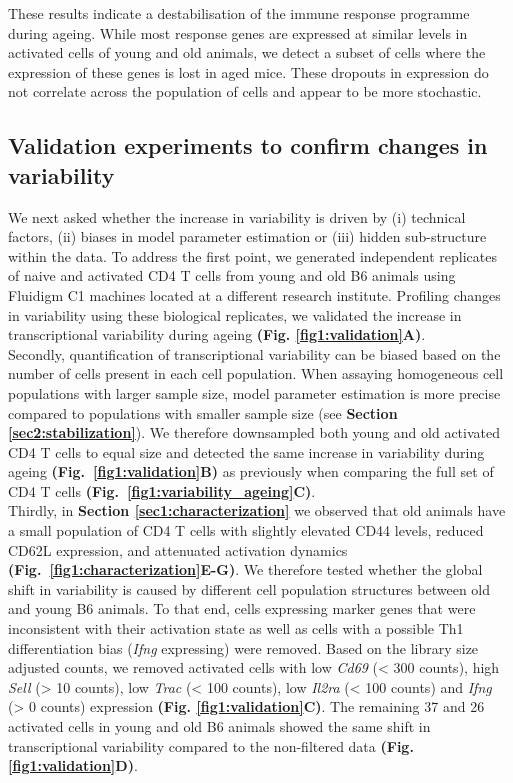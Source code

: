 \newpage

These results indicate a destabilisation of the immune response programme during ageing. While most response genes are expressed at similar levels in activated cells of young and old animals, we detect a subset of cells where the expression of these genes is lost in aged mice. These dropouts in expression do not correlate across the population of cells and appear to be more stochastic. 

\subsection{Validation experiments to confirm changes in variability}

We next asked whether the increase in variability is driven by (i) technical factors, (ii) biases in model parameter estimation or (iii) hidden sub-structure within the data. To address the first point, we generated independent replicates of naive and activated CD4\plus{} T cells from young and old B6 animals using Fluidigm C1 machines located at a different research institute. Profiling changes in variability using these biological replicates, we validated the increase in transcriptional variability during ageing \textbf{(Fig. \ref{fig1:validation}A)}.\\

Secondly, quantification of transcriptional variability can be biased based on the number of cells present in each cell population. When assaying homogeneous cell populations with larger sample size, model parameter estimation is more precise compared to populations with smaller sample size (see \textbf{Section \ref{sec2:stabilization}}). We therefore downsampled both young and old activated CD4\plus{} T cells to equal size and detected the same increase in variability during ageing \textbf{(Fig.~\ref{fig1:validation}B)} as previously when comparing the full set of CD4\plus{} T cells \textbf{(Fig.~\ref{fig1:variability_ageing}C)}. \\

Thirdly, in \textbf{Section \ref{sec1:characterization}} we observed that old animals have a small population of CD4\plus{} T cells with slightly elevated CD44 levels, reduced CD62L expression, and attenuated activation dynamics \textbf{(Fig.~\ref{fig1:characterization}E-G)}. We therefore tested whether the global shift in variability is caused by different cell population structures between old and young B6 animals. To that end, cells expressing marker genes that were inconsistent with their activation state as well as cells with a possible Th1 differentiation bias (\textit{Ifng} expressing) were removed. Based on the library size adjusted counts, we removed activated cells with low \textit{Cd69} (< 300 counts), high \textit{Sell} (> 10 counts), low \textit{Trac} (< 100 counts), low \textit{Il2ra} (< 100 counts) and \textit{Ifng} (> 0 counts) expression \textbf{(Fig. \ref{fig1:validation}C)}. The remaining 37 and 26 activated cells in young and old B6 animals showed the same shift in transcriptional variability compared to the non-filtered data \textbf{(Fig. \ref{fig1:validation}D)}. 

